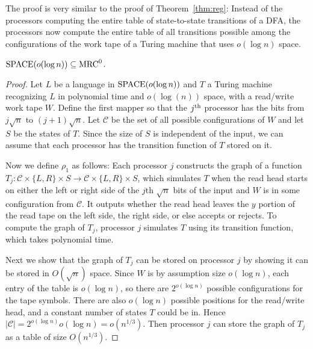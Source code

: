 The proof is very similar to the proof of Theorem~\ref{thm:reg}:  Instead of
the processors computing the entire table of state-to-state transitions of a
DFA, the processors now compute the entire table of all transitions possible
among the configurations of the work tape of a Turing machine that uses $o(\log
n)$ space. 

\begin{theorem} \label{thm:sublogspace}
$\textup{SPACE}(o(\log n))\subseteq \textup{MRC}^0$.
\end{theorem}

\begin{proof}
Let $L$ be a language in $\textup{SPACE}(o(\log n))$ and $T$ a Turing machine
recognizing $L$ in polynomial time and $o(\log(n))$ space, with a read/write
work tape $W$. Define the first mapper so that the $j^\textup{th}$ processor
has the bits from $j\sqrt{n}$ to $(j+1)\sqrt{n}$. Let $\mathcal{C}$ be the set
of all possible configurations of $W$ and let $S$ be the states of $T$. Since
the size of $S$ is independent of the input, we can assume that each processor
has the transition function of $T$ stored on it.

Now we define $\rho_1$ as follows: Each processor $j$ constructs the graph of a
function $T_j:\mathcal{C} \times \{L,R\} \times S \rightarrow \mathcal{C}
\times \{L,R\} \times S$, which simulates $T$ when the read head starts on
either the left or right side of the $j$th $\sqrt{n}$ bits of the input and $W$
is in some configuration from $\mathcal{C}$. It outputs whether the read head
leaves the $y$ portion of the read tape on the left side, the right side, or
else accepts or rejects. To compute the graph of $T_j$, processor $j$
simulates $T$ using its transition function, which takes polynomial time.

Next we show that the graph of $T_j$ can be stored on processor $j$ by showing
it can be stored in $O(\sqrt{n})$ space. Since $W$ is by assumption size
$o(\log n)$, each entry of the table is $o(\log n)$, so there are $2^{o(\log
n)}$ possible configurations for the tape symbols. There are also $o(\log n)$
possible positions for the read/write head, and a constant number of states $T$
could be in. Hence $|\mathcal{C}| = 2^{o(\log n)} o(\log n) = o(n^{1/3})$.
Then processor $j$ can store the graph of $T_j$ as a table of size
$O(n^{1/3})$.


\end{proof}
